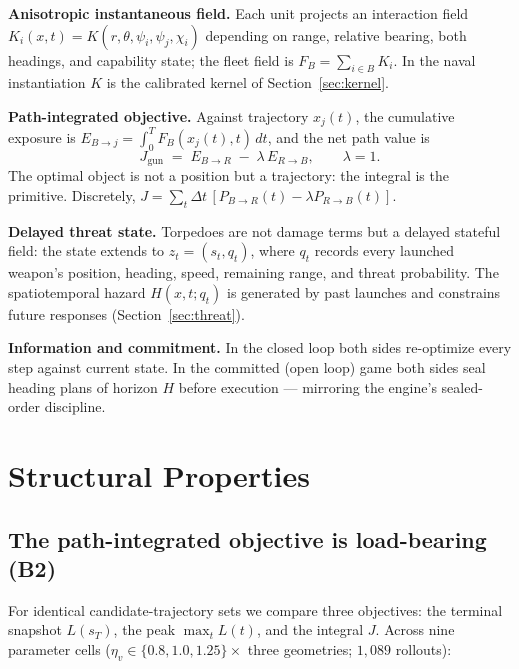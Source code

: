 \documentclass[12pt,a4paper]{article}
\newcommand{\etav}{\eta_v}
\begin{document}
\noindent\textbf{Anisotropic instantaneous field.}  Each unit projects an
interaction field $K_i(x,t)=K(r,\theta,\psi_i,\psi_j,\chi_i)$ depending on
range, relative bearing, both headings, and capability state; the fleet field
is $F_B=\sum_{i\in B}K_i$.  In the naval instantiation $K$ is the calibrated
kernel of Section~\ref{sec:kernel}.

\noindent\textbf{Path-integrated objective.}  Against trajectory $x_j(t)$,
the cumulative exposure is $E_{B\to j}=\int_0^T F_B(x_j(t),t)\,dt$, and the
net path value is
\begin{equation}
J_{\text{gun}} \;=\; E_{B\to R} \;-\; \lambda\, E_{R\to B},
\qquad \lambda = 1.
\label{eq:J}
\end{equation}
The optimal object is not a position but a trajectory: the integral is the
primitive.  Discretely, $J=\sum_t \Delta t\,[P_{B\to R}(t)-\lambda
P_{R\to B}(t)]$.

\noindent\textbf{Delayed threat state.}  Torpedoes are not damage terms but a
delayed stateful field: the state extends to $z_t=(s_t,q_t)$, where $q_t$
records every launched weapon's position, heading, speed, remaining range,
and threat probability.  The spatiotemporal hazard $H(x,t;q_t)$ is generated
by past launches and constrains future responses (Section~\ref{sec:threat}).

\noindent\textbf{Information and commitment.}  In the closed loop both sides
re-optimize every step against current state.  In the committed (open loop)
game both sides seal heading plans of horizon $H$ before execution ---
mirroring the engine's sealed-order discipline.

\section{Structural Properties}\label{sec:structural}

\subsection{The path-integrated objective is load-bearing (B2)}\label{sec:b2}

For identical candidate-trajectory sets we compare three objectives:
the terminal snapshot $L(s_T)$, the peak $\max_t L(t)$, and the integral
$J$.  Across nine parameter cells ($\etav\in\{0.8,1.0,1.25\}\times$ three
geometries; $1{,}089$ rollouts):
\end{document}
